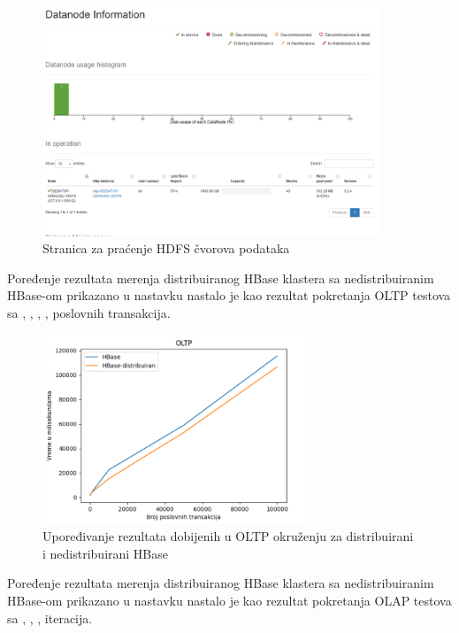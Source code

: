 \documentclass[12pt,oneside]{memoir}
\begin{document}
\begin{figure}[!ht]
  \centering
  \includegraphics[width=0.9\textwidth]{datanode.png}
  \caption{Stranica za praćenje HDFS čvorova podataka}
  \label{fig:grafikon}
\end{figure}


Poređenje rezultata merenja distribuiranog HBase klastera sa nedistribuiranim HBase-om  prikazano u nastavku nastalo je kao rezultat pokretanja OLTP testova sa , , , ,  poslovnih transakcija.

\begin{figure}[!ht]
  \centering
  \includegraphics[width=0.7\textwidth]{dist-results.png}
  \caption{Upoređivanje rezultata dobijenih u OLTP okruženju za distribuirani i nedistribuirani HBase}
  \label{fig:grafikon}
\end{figure}

\pagebreak

Poređenje rezultata merenja distribuiranog HBase klastera sa nedistribuiranim HBase-om prikazano u nastavku nastalo je kao rezultat pokretanja OLAP testova sa , , ,  iteracija.
\end{document}

